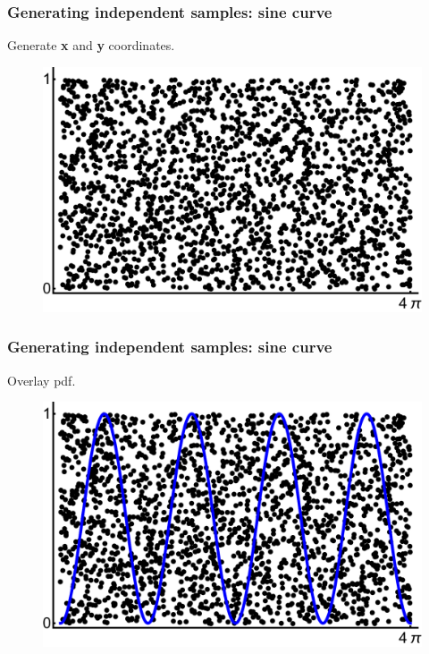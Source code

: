 \documentclass[handout]{beamer}
\begin{document}
\begin{frame}
\frametitle{Generating independent samples: sine curve}
Generate \textbf{x} and \textbf{y} coordinates.

\begin{figure}[ht]
\centerline{\includegraphics[width=1\textwidth]{animations_figures/lec4_rejection2.pdf}}
\end{figure}

\end{frame}

\begin{frame}
\frametitle{Generating independent samples: sine curve}
Overlay pdf.

\begin{figure}[ht]
\centerline{\includegraphics[width=1\textwidth]{animations_figures/lec4_rejection3.pdf}}
\end{figure}

\end{frame}
\end{document}

